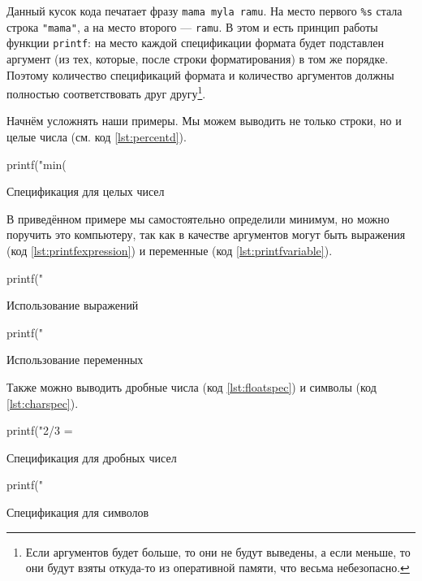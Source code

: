 \documentclass[12pt]{article}
\begin{document}
Данный кусок кода печатает фразу \verb|mama myla ramu|. На место первого \verb|%s| стала строка \verb|"mama"|, а на место второго --- \verb|ramu|. В этом и есть принцип работы функции \verb|printf|: на место каждой спецификации формата будет подставлен аргумент (из тех, которые, после строки форматирования) в том же порядке. Поэтому количество спецификаций формата и количество аргументов должны полностью соответствовать друг другу\footnote{Если аргументов будет больше, то они не будут выведены, а если меньше, то они будут взяты откуда-то из оперативной памяти, что весьма небезопасно.}.

Начнём усложнять наши примеры. Мы можем выводить не только строки, но и целые числа (см. код \ref{lst:percentd}).
\begin{listing}[H]
\begin{center}
\begin{ccode}
printf("min(%
\end{ccode}
\end{center}
\caption{Спецификация для целых чисел}
\label{lst:percentd}
\end{listing}
В приведённом примере мы самостоятельно определили минимум, но можно поручить это компьютеру, так как в качестве аргументов могут быть выражения (код \ref{lst:printfexpression}) и переменные (код \ref{lst:printfvariable}).
\begin{listing}[H]
\begin{center}
\begin{ccode}
printf("%
\end{ccode}
\end{center}
\caption{Использование выражений}
\label{lst:printfexpression}
\end{listing}
\begin{listing}[H]
\begin{center}
\begin{ccode}
printf("%
\end{ccode}
\end{center}
\caption{Использование переменных}
\label{lst:printfvariable}
\end{listing}

Также можно выводить дробные числа (код \ref{lst:floatspec}) и символы (код \ref{lst:charspec}).
\begin{listing}[H]
\begin{center}
\begin{ccode}
printf("2/3 = %
\end{ccode}
\end{center}
\caption{Спецификация для дробных чисел}
\label{lst:floatspec}
\end{listing}

\begin{listing}[H]
\begin{center}
\begin{ccode}
printf("%
\end{ccode}
\end{center}
\caption{Спецификация для символов}
\label{lst:charspec}
\end{listing}
\end{document}
